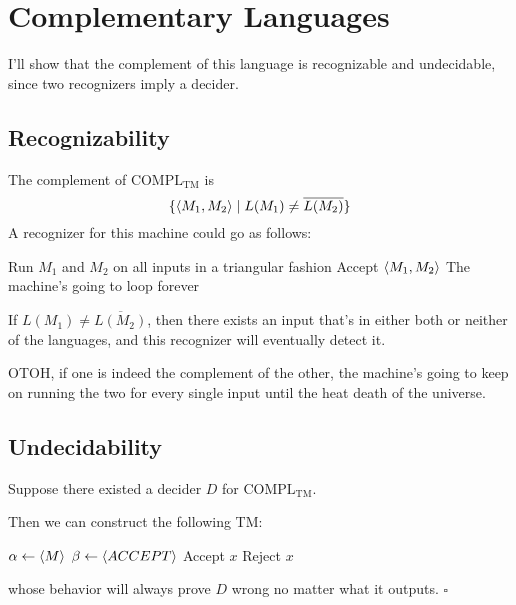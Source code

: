 \documentclass[12pt]{article}
\begin{document}
\section{Complementary Languages}

I'll show that the complement of this language is
recognizable and undecidable, since two recognizers imply a decider.

\subsection{Recognizability}

The complement of $\text{COMPL}_\text{TM}$ is
\[\{\Braket{M_1, M_2} \mid L(M_1) \ne \overline{L(M_2)}\}\]
A recognizer for this machine could go as follows:
\begin{algorithmic}[1]
        \State Run $M_1$ and $M_2$ on all inputs in a triangular fashion
            \State Accept $\braket{M_1, M_2}$
        \Else
            \State The machine's going to loop forever
        \EndIf
    \EndProcedure
\end{algorithmic}

If $L(M_1) \ne \overline{L(M_2)}$, then there exists an input
that's in either both or neither of the languages, and this recognizer
will eventually detect it.

OTOH, if one is indeed the complement of the other, the machine's going
to keep on running the two for every single input until the heat death of the universe.

\subsection{Undecidability}

Suppose there existed a decider $D$ for $\text{COMPL}_\text{TM}$.

Then we can construct the following TM:
\begin{algorithmic}[1]
        \State $\alpha \gets \braket{M}$
        \State $\beta \gets \braket{ACCEPT}$
            \State Accept $x$
        \Else
            \State Reject $x$
        \EndIf
    \EndProcedure
\end{algorithmic}
whose behavior will always prove $D$ wrong no matter what it outputs. $\square$
\end{document}

